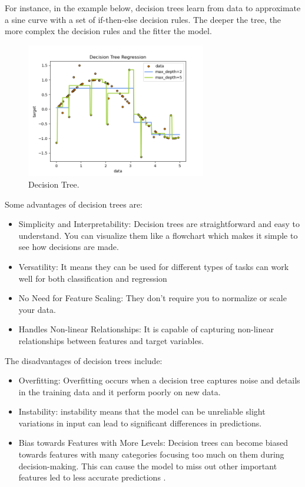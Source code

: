 \documentclass[11pt]{article}
\begin{document}
For instance, in the example below, decision trees learn from data to approximate a sine curve with a set of if-then-else decision rules. The deeper the tree, the more complex the decision rules and the fitter the model.

\begin{figure}[H]
	\centering
	\includegraphics[width=0.7\textwidth]{figure/decision_tree.png}
	\caption{Decision Tree.}
	\label{fig:DecisionTree}
\end{figure}

Some advantages of decision trees are:
\begin{itemize}
	\item Simplicity and Interpretability: Decision trees are straightforward and easy to understand. You can visualize them like a flowchart which makes it simple to see how decisions are made.	
	
	\item Versatility: It means they can be used for different types of tasks can work well for both classification and regression
	
	\item No Need for Feature Scaling: They don’t require you to normalize or scale your data. 
	
	\item Handles Non-linear Relationships: It is capable of capturing non-linear relationships between features and target variables.	
\end{itemize}


The disadvantages of decision trees include:
\begin{itemize}
\item Overfitting: Overfitting occurs when a decision tree captures noise and details in the training data and it perform poorly on new data.

\item  Instability: instability means that the model can be unreliable slight variations in input can lead to significant differences in predictions.

\item Bias towards Features with More Levels: Decision trees can become biased towards features with many categories focusing too much on them during decision-making. This can cause the model to miss out other important features led to less accurate predictions .
\end{itemize}
\end{document}
